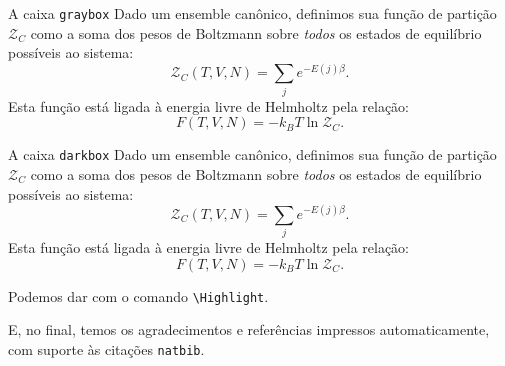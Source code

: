 \begin{graybox}{A caixa \texttt{graybox}}
    Dado um ensemble canônico, definimos sua função de partição $\mathcal{Z}_C$ como a soma dos pesos de Boltzmann sobre \textit{todos} os estados de equilíbrio possíveis ao sistema:
    \begin{equation}
        \mathcal{Z}_C(T,V,N) = \sum_{j}e^{-E(j)\beta}.
    \end{equation}
    Esta função está ligada à energia livre de Helmholtz pela relação:
    \begin{equation}
        F(T,V,N)=-k_BT\ln\mathcal{Z}_C.
    \end{equation}
\end{graybox}

\begin{darkbox}{A caixa \texttt{darkbox}}
    Dado um ensemble canônico, definimos sua função de partição $\mathcal{Z}_C$ como a soma dos pesos de Boltzmann sobre \textit{todos} os estados de equilíbrio possíveis ao sistema:
    \begin{equation}
        \mathcal{Z}_C(T,V,N) = \sum_{j}e^{-E(j)\beta}.
    \end{equation}
    Esta função está ligada à energia livre de Helmholtz pela relação:
    \begin{equation}
        F(T,V,N)=-k_BT\ln\mathcal{Z}_C.
    \end{equation}
\end{darkbox}


Podemos dar  com o comando \verb|\Highlight|.

E, no final, temos os agradecimentos e referências impressos automaticamente, com suporte às citações \texttt{natbib}.
